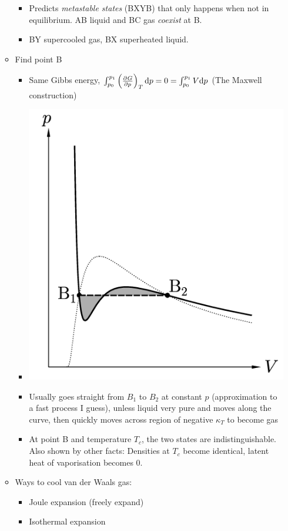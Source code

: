 \documentclass{article}
\theoremstyle{remark}
\newcommand{\ppdv}[4][]{\left(\pdv[#1]{#2}{#3}\right)_{#4}}
\begin{document}
\begin{enumerate}
\begin{itemize}
\begin{minipage}{0.6\linewidth}
\begin{itemize}
                        \item Predicts \emph{metastable states} (BXYB) that only happens when not in equilibrium. AB liquid and BC gas \emph{coexist} at B.
                        \item BY supercooled gas, BX superheated liquid.
                    \end{itemize}
                \end{minipage}
            \item Find point B\begin{itemize}
                    \item Same Gibbs energy, $\int_{p_0}^{p_1}\ppdv{G}{p}{T}\dd p=0=\int_{p_0}^{p_1}V\dd p$ (The Maxwell construction)
                    \item \begin{center}
                            \includegraphics[width=0.5\linewidth]{van_der_waal_maxwell.png}
                        \end{center}
                    \item Usually goes straight from $B_1$ to $B_2$ at constant $p$ (approximation to a fast process I guess), unless liquid very pure and moves along the curve, then quickly moves across region of negative $\kappa_T$ to become gas
                    \item At point B and temperature $T_c$, the two states are indistinguishable. Also shown by other facts:
                        Densities at $T_c$ become identical, latent heat of vaporisation becomes 0.
                \end{itemize}
            \item Ways to cool van der Waals gas:\begin{itemize}
                    \item Joule expansion (freely expand)
                    \item Isothermal expansion

\end{itemize}
\end{itemize}
\end{enumerate}
\end{document}
